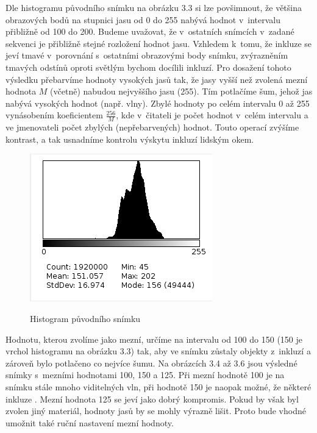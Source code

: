 \documentclass[12pt, a4paper]{report}
\begin{document}
	Dle histogramu původního snímku na obrázku 3.3 si lze povšimnout, že většina obrazových bodů na stupnici jasu od 0 do 255 nabývá hodnot v~intervalu přibližně od 100 do 200. Budeme uvažovat, že v~ostatních snímcích v~zadané sekvenci je přibližně stejné rozložení hodnot jasu. Vzhledem k~tomu, že inkluze se jeví tmavé v~porovnání s~ostatními obrazovými body snímku, zvýrazněním tmavých odstínů oproti světlým bychom docílili  inkluzí. Pro dosažení tohoto výsledku přebarvíme hodnoty vysokých jasů tak, že jasy vyšší než zvolená mezní hodnota $M$ (včetně) nabudou nejvyššího jasu (255). Tím potlačíme šum, jehož jas nabývá vysokých hodnot (např. vlny). Zbylé hodnoty  po celém intervalu 0 až 255 vynásobením koeficientem $\frac{256}{M}$, kde v~čitateli je počet hodnot v~celém intervalu a ve jmenovateli počet zbylých (nepřebarvených) hodnot. Touto operací zvýšíme kontrast, a tak usnadníme kontrolu výskytu inkluzí lidským okem. 
	
	\begin{figure}[!htb]
	\centering
	\includegraphics[scale=0.65]{obrazky/puvodni_histogram.png}
	\label{fig:puvodni_histogram}
	\caption{Histogram původního snímku}
	\end{figure}	
	
	Hodnotu, kterou zvolíme jako mezní, určíme na intervalu od 100 do 150 (150 je vrchol histogramu na obrázku 3.3) tak, aby ve snímku zůstaly objekty  z~inkluzí a zároveň bylo potlačeno co nejvíce šumu. Na obrázcích 3.4 až 3.6 jsou výsledné snímky s~mezními hodnotami 100, 150 a 125. Při mezní hodnotě 100 je na snímku stále mnoho viditelných vln, při hodnotě 150 je naopak možné, že některé inkluze . Mezní hodnota 125 se jeví jako dobrý kompromis. Pokud by však byl zvolen jiný materiál, hodnoty jasů by se mohly výrazně lišit. Proto bude vhodné umožnit také ruční nastavení mezní hodnoty.
	
\end{document}
